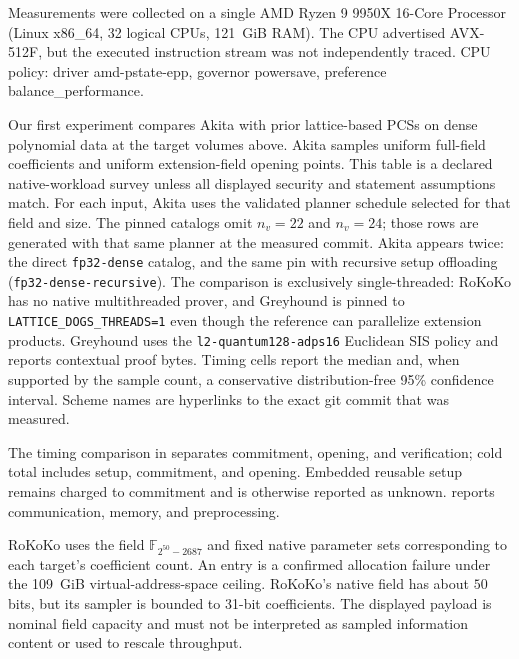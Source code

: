 Measurements were collected on a single AMD Ryzen 9 9950X 16-Core Processor (Linux x86\_64, 32 logical CPUs, 121~GiB RAM). The CPU advertised AVX-512F, but the executed instruction stream was not independently traced. CPU policy: driver amd-pstate-epp, governor powersave, preference balance\_performance.

Our first experiment compares Akita with prior lattice-based PCSs on dense
polynomial data at the target volumes above. Akita samples uniform full-field
coefficients and uniform extension-field opening points. This table is a declared
native-workload survey unless all displayed security and statement assumptions match.
For each input, Akita
uses the validated planner schedule selected for that field and size.
The pinned catalogs omit $n_v=22$ and $n_v=24$; those rows are generated
with that same planner at the measured commit.
Akita appears twice: the direct \texttt{fp32-dense} catalog, and the same pin
with recursive setup offloading (\texttt{fp32-dense-recursive}).
The comparison is exclusively single-threaded: RoKoKo has no native multithreaded
prover, and Greyhound is pinned to \texttt{LATTICE\_DOGS\_THREADS=1} even though the
reference can parallelize extension products. Greyhound uses the
\texttt{l2-quantum128-adps16} Euclidean SIS policy and reports contextual proof bytes.
Timing cells report the median and, when supported by the sample count, a
conservative distribution-free 95\% confidence interval. Scheme names are hyperlinks to the exact git commit that was measured.

The timing comparison in  separates commitment,
opening, and verification; cold total includes setup, commitment, and opening.
Embedded reusable setup remains charged to commitment and is otherwise reported as unknown.
 reports communication, memory, and preprocessing.

RoKoKo uses the field $\mathbb F_{2^{50}-2687}$ and fixed native parameter
sets corresponding to each target's coefficient count.  An
\evaloom{} entry is a confirmed allocation failure under the 109~GiB virtual-address-space ceiling.
RoKoKo's native field has about $50$ bits, but its sampler is bounded to
31-bit coefficients. The displayed payload is nominal field capacity and must not
be interpreted as sampled information content or used to rescale throughput.

